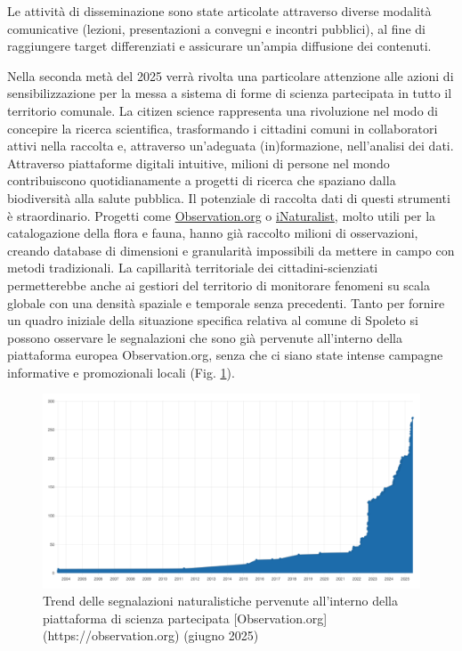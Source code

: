 \documentclass[
  a4paper,
]{book}
\begin{document}
Le attività di disseminazione sono state articolate attraverso diverse modalità comunicative (lezioni, presentazioni a convegni e incontri pubblici), al fine di raggiungere target differenziati e assicurare un'ampia diffusione dei contenuti.

Nella seconda metà del 2025 verrà rivolta una particolare attenzione alle azioni di sensibilizzazione per la messa a sistema di forme di scienza partecipata in tutto il territorio comunale. La citizen science rappresenta una rivoluzione nel modo di concepire la ricerca scientifica, trasformando i cittadini comuni in collaboratori attivi nella raccolta e, attraverso un'adeguata (in)formazione, nell'analisi dei dati. Attraverso piattaforme digitali intuitive, milioni di persone nel mondo contribuiscono quotidianamente a progetti di ricerca che spaziano dalla biodiversità alla salute pubblica. Il potenziale di raccolta dati di questi strumenti è straordinario. Progetti come \href{https://observation.org}{Observation.org} o \href{https://www.inaturalist.org}{iNaturalist}, molto utili per la catalogazione della flora e fauna, hanno già raccolto milioni di osservazioni, creando database di dimensioni e granularità impossibili da mettere in campo con metodi tradizionali. La capillarità territoriale dei cittadini-scienziati permetterebbe anche ai gestiori del territorio di monitorare fenomeni su scala globale con una densità spaziale e temporale senza precedenti.
Tanto per fornire un quadro iniziale della situazione specifica relativa al comune di Spoleto si possono osservare le segnalazioni che sono già pervenute all'interno della piattaforma europea Observation.org, senza che ci siano state intense campagne informative e promozionali locali (Fig. \ref{fig:obs2025}).

\begin{figure}

{\centering \includegraphics[width=\linewidth]{./figs/observationPlot} 

}

\caption{Trend delle segnalazioni naturalistiche pervenute all'interno della piattaforma di scienza partecipata [Observation.org](https://observation.org) (giugno 2025)}\label{fig:obs2025}
\end{figure}
\end{document}

